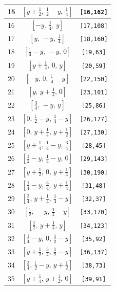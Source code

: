 \documentclass[fleqn,8pt]{jsarticle}
\begin{document}
\begin{longtable}{ccc}
15 & $\left[ y + \frac{1}{2},\, \frac{1}{2} - y,\, \frac{1}{4} \right]$ & {\tt [16,162]} \\ \hline
16 & $\left[ - y,\, \frac{1}{4},\, y \right]$ & {\tt [17,108]} \\ \hline
17 & $\left[ y,\, - y,\, \frac{1}{4} \right]$ & {\tt [18,160]} \\ \hline
18 & $\left[ \frac{1}{4} - y,\, - y,\, 0 \right]$ & {\tt [19,63]} \\ \hline
19 & $\left[ y + \frac{1}{4},\, 0,\, y \right]$ & {\tt [20,59]} \\ \hline
20 & $\left[ - y,\, 0,\, \frac{1}{4} - y \right]$ & {\tt [22,150]} \\ \hline
21 & $\left[ y,\, y + \frac{1}{4},\, 0 \right]$ & {\tt [23,101]} \\ \hline
22 & $\left[ \frac{3}{4},\, - y,\, y \right]$ & {\tt [25,86]} \\ \hline
23 & $\left[ 0,\, \frac{1}{2} - y,\, \frac{1}{4} - y \right]$ & {\tt [26,177]} \\ \hline
24 & $\left[ 0,\, y + \frac{1}{4},\, y + \frac{1}{2} \right]$ & {\tt [27,130]} \\ \hline
25 & $\left[ y + \frac{1}{4},\, \frac{1}{4} - y,\, \frac{3}{4} \right]$ & {\tt [28,45]} \\ \hline
26 & $\left[ \frac{1}{2} - y,\, \frac{1}{4} - y,\, 0 \right]$ & {\tt [29,143]} \\ \hline
27 & $\left[ y + \frac{1}{2},\, 0,\, y + \frac{1}{4} \right]$ & {\tt [30,190]} \\ \hline
28 & $\left[ \frac{1}{4} - y,\, \frac{3}{4},\, y + \frac{1}{4} \right]$ & {\tt [31,48]} \\ \hline
29 & $\left[ \frac{3}{4},\, y + \frac{1}{4},\, \frac{1}{4} - y \right]$ & {\tt [32,37]} \\ \hline
30 & $\left[ \frac{1}{2},\, - y,\, \frac{1}{4} - y \right]$ & {\tt [33,170]} \\ \hline
31 & $\left[ \frac{1}{2},\, y + \frac{1}{4},\, y \right]$ & {\tt [34,123]} \\ \hline
32 & $\left[ \frac{1}{4} - y,\, 0,\, \frac{1}{2} - y \right]$ & {\tt [35,92]} \\ \hline
33 & $\left[ y + \frac{1}{2},\, \frac{3}{4},\, \frac{1}{2} - y \right]$ & {\tt [36,137]} \\ \hline
34 & $\left[ \frac{3}{4},\, \frac{1}{2} - y,\, y + \frac{1}{2} \right]$ & {\tt [38,73]} \\ \hline
35 & $\left[ y + \frac{1}{4},\, y + \frac{1}{2},\, 0 \right]$ & {\tt [39,91]} \\ \hline

\end{longtable}
\end{document}
